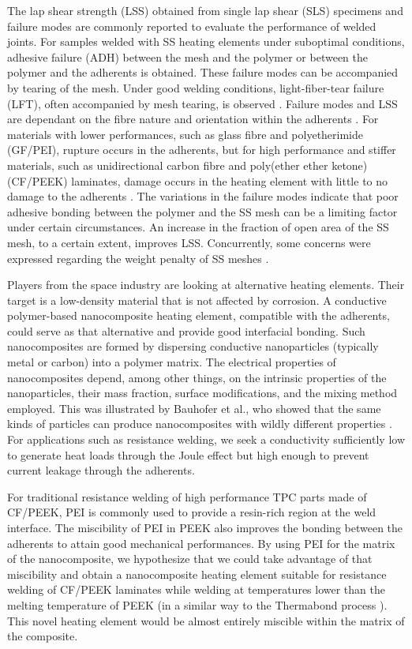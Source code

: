 \documentclass[11pt,review,times]{elsarticle}
\begin{document}
The lap shear strength (LSS) obtained from single lap shear (SLS) specimens and failure modes are commonly reported to evaluate the performance of welded joints. 
For samples welded with SS heating elements under suboptimal conditions, adhesive failure (ADH) between the mesh and the polymer or between the polymer and the adherents is obtained. 
These failure modes can be accompanied by tearing of the mesh. 
Under good welding conditions, light-fiber-tear failure (LFT), often accompanied by mesh tearing, is observed \cite{Shi2014}. 
Failure modes and LSS are dependant on the fibre nature and orientation within the adherents \cite{Shi2013a}. 
For materials with lower performances, such as glass fibre and polyetherimide (GF/PEI), rupture occurs in the adherents, but for high performance and stiffer materials, such as unidirectional carbon fibre and poly(ether ether ketone) (CF/PEEK) laminates, damage occurs in the heating element with little to no damage to the adherents \cite{Dube2015}. 
The variations in the failure modes indicate that poor adhesive bonding between the polymer and the SS mesh \cite{Dube2007,Dube2012a,Dube2009a,Shi2014,Shi2015a} can be a limiting factor under certain circumstances. 
An increase in the fraction of open area of the SS mesh, to a certain extent, improves LSS. 
Concurrently, some concerns were expressed regarding the weight penalty of SS meshes \cite{Stavrov2005a}. 

Players from the space industry are looking at alternative heating elements.  
Their target is a low-density material that is not affected by corrosion. 
A conductive polymer-based nanocomposite heating element, compatible with the adherents, could serve as that alternative and provide good interfacial bonding. 
Such nanocomposites are formed by dispersing conductive nanoparticles (typically metal or carbon) into a polymer matrix. 
The electrical properties of nanocomposites depend, among other things, on the intrinsic properties of the nanoparticles, their mass fraction, surface modifications, and the mixing method employed. 
This was illustrated by Bauhofer et al., who showed that the same kinds of particles can produce nanocomposites with wildly different properties \cite{Bauhofer2009}. 
For applications such as resistance welding, we seek a conductivity sufficiently low to generate heat loads through the Joule effect but high enough to prevent current leakage through the adherents. 

For traditional resistance welding of high performance TPC parts made of CF/PEEK, PEI is commonly used to provide a resin-rich region at the weld interface. 
The miscibility of PEI in PEEK \cite{Crevecoeur1991} also improves the bonding between the adherents to attain good mechanical performances. 
By using PEI for the matrix of the nanocomposite, we hypothesize that we could take advantage of that miscibility and obtain a nanocomposite heating element suitable for resistance welding of CF/PEEK laminates while welding at temperatures lower than the melting temperature of PEEK (in a similar way to the Thermabond process \cite{Smiley1991a}). 
This novel heating element would be almost entirely miscible within the matrix of the composite. 
\end{document}
